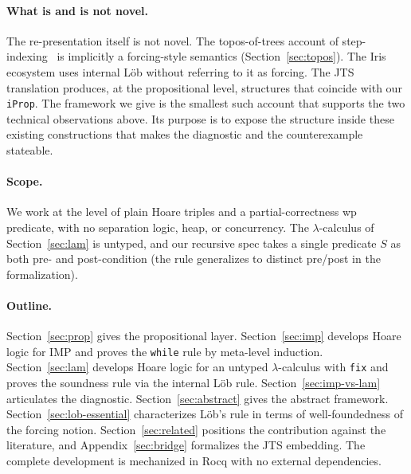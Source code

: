 \paragraph{What is and is not novel.}
The re-presentation itself is not novel.  The topos-of-trees account
of step-indexing~\cite{birkedal-et-al-2012} is implicitly a
forcing-style semantics (Section~\ref{sec:topos}). The Iris
ecosystem uses internal Löb without referring to it as forcing. The
JTS translation produces, at the propositional level, structures
that coincide with our \texttt{iProp}.  The framework we give is the
smallest such account that supports the two technical observations
above.  Its purpose is to expose the structure inside these existing
constructions that makes the diagnostic and the counterexample
stateable.

\paragraph{Scope.}
We work at the level of plain Hoare triples and a partial-correctness
wp predicate, with no separation logic, heap, or concurrency.  The
$\lambda$-calculus of Section~\ref{sec:lam} is untyped, and our
recursive spec takes a single predicate $S$ as both pre- and
post-condition (the rule generalizes to distinct pre/post in the
formalization).

\paragraph{Outline.}
Section~\ref{sec:prop} gives the propositional layer.
Section~\ref{sec:imp} develops Hoare logic for IMP and proves the
\texttt{while} rule by meta-level induction.
Section~\ref{sec:lam} develops Hoare logic for an untyped
$\lambda$-calculus with \texttt{fix} and proves the soundness rule
via the internal Löb rule.  Section~\ref{sec:imp-vs-lam} articulates
the diagnostic.  Section~\ref{sec:abstract} gives the abstract
framework.  Section~\ref{sec:lob-essential} characterizes L\"ob's rule
in terms of well-foundedness of the forcing notion.
Section~\ref{sec:related} positions the contribution against the
literature, and Appendix~\ref{sec:bridge} formalizes the JTS
embedding.  The complete development is mechanized in
Rocq with no external dependencies.
